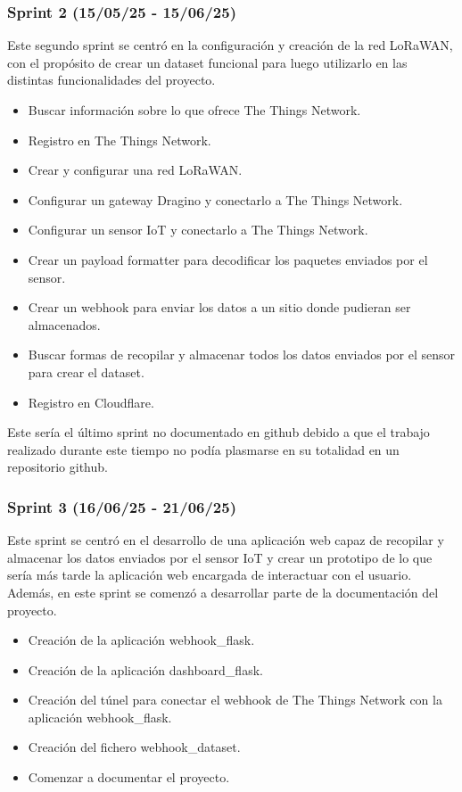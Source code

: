 \subsubsection{Sprint 2 (15/05/25 - 15/06/25)}
Este segundo sprint se centró en la configuración y creación de la red LoRaWAN, con el propósito de crear un dataset funcional para luego utilizarlo en las distintas funcionalidades del proyecto.

\begin{itemize}
    \item Buscar información sobre lo que ofrece The Things Network.
    \item Registro en The Things Network.
    \item Crear y configurar una red LoRaWAN.
    \item Configurar un gateway Dragino y conectarlo a The Things Network.
    \item Configurar un sensor IoT y conectarlo a The Things Network.
    \item Crear un payload formatter para decodificar los paquetes enviados por el sensor.
    \item Crear un webhook para enviar los datos a un sitio donde pudieran ser almacenados.
    \item Buscar formas de recopilar y almacenar todos los datos enviados por el sensor para crear el dataset.
    \item Registro en Cloudflare.
\end{itemize}

Este sería el último sprint no documentado en github debido a que el trabajo realizado durante este tiempo no podía plasmarse en su totalidad en un repositorio github.

\subsubsection{Sprint 3 (16/06/25 - 21/06/25)}
Este sprint se centró en el desarrollo de una aplicación web capaz de recopilar y almacenar los datos enviados por el sensor IoT y crear un prototipo de lo que sería más tarde la aplicación web encargada de interactuar con el usuario. Además, en este sprint se comenzó a desarrollar parte de la documentación del proyecto. 

\begin{itemize}
    \item Creación de la aplicación webhook\_flask.
    \item Creación de la aplicación dashboard\_flask.
    \item Creación del túnel para conectar el webhook de The Things Network con la aplicación webhook\_flask.
    \item Creación del fichero webhook\_dataset.
    \item Comenzar a documentar el proyecto.
\end{itemize}

